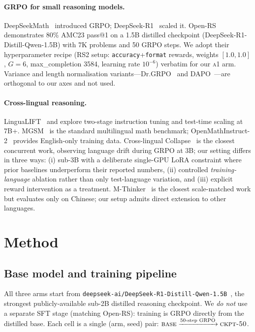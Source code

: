 \documentclass[11pt]{article}
\newcommand{\armA}{\textsc{a1}}
\begin{document}
\paragraph{GRPO for small reasoning models.}
DeepSeekMath~\cite{deepseekmath_2024} introduced GRPO; DeepSeek-R1~\cite{deepseekR1_2025}
scaled it. Open-RS~\cite{openRS_2025} demonstrates 80\% AMC23 pass@1 on a 1.5B
distilled checkpoint (DeepSeek-R1-Distill-Qwen-1.5B) with 7K problems and 50 GRPO
steps. We adopt their hyperparameter recipe (RS2 setup: \texttt{accuracy}+\texttt{format}
rewards, weights $[1.0, 1.0]$, $G{=}6$, max\_completion 3584, learning rate $10^{-6}$)
verbatim for our \armA{} arm. Variance and length normalisation
variants---Dr.GRPO~\cite{drgrpo_2025} and DAPO~\cite{dapo_2025}---are orthogonal to
our axes and not used.

\paragraph{Cross-lingual reasoning.}
LinguaLIFT~\cite{lingualift_2024} and \citet{xreasoning_test_time_2025} explore
two-stage instruction tuning and test-time scaling at 7B+. MGSM~\cite{mgsm_2022} is
the standard multilingual math benchmark; OpenMathInstruct-2~\cite{openmathinstruct2_2024}
provides English-only training data. Cross-lingual
Collapse~\cite{xlingual_collapse_2025} is the closest concurrent work, observing
language drift during GRPO at 3B; our setting differs in three ways: (i) sub-3B with
a deliberate single-GPU LoRA constraint where prior baselines underperform their
reported numbers, (ii) controlled \emph{training-language} ablation rather than only
test-language variation, and (iii) explicit reward intervention as a treatment.
M-Thinker~\cite{mthinker_2025} is the closest scale-matched work but evaluates only
on Chinese; our setup admits direct extension to other languages.

\section{Method}
\label{sec:method}

\subsection{Base model and training pipeline}
All three arms start from \texttt{deepseek-ai/DeepSeek-R1-Distill-Qwen-1.5B}~\cite{deepseekR1_2025},
the strongest publicly-available sub-2B distilled reasoning checkpoint. We \emph{do not}
use a separate SFT stage (matching Open-RS): training is GRPO directly from the
distilled base. Each cell is a single (arm, seed) pair: $\textsc{base}
\xrightarrow{\text{50-step GRPO}} \textsc{ckpt-50}$.
\end{document}
